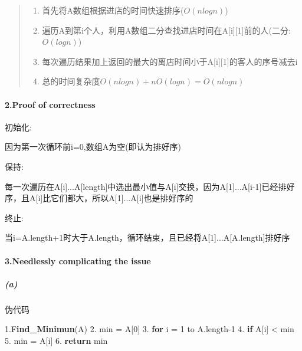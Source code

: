 \documentclass[
]{article}
\newenvironment{Shaded}{}{}
\newcommand{\BuiltInTok}[1]{#1}
\newcommand{\ControlFlowTok}[1]{\textcolor[rgb]{0.00,0.44,0.13}{\textbf{#1}}}
\newcommand{\DecValTok}[1]{\textcolor[rgb]{0.25,0.63,0.44}{#1}}
\newcommand{\ErrorTok}[1]{\textcolor[rgb]{1.00,0.00,0.00}{\textbf{#1}}}
\newcommand{\FloatTok}[1]{\textcolor[rgb]{0.25,0.63,0.44}{#1}}
\newcommand{\NormalTok}[1]{#1}
\begin{document}
\begin{quote}
\begin{enumerate}
\def\labelenumi{\arabic{enumi}.}
\item
  首先将A数组根据进店的时间快速排序(\(O(nlogn)\))
\item
  遍历A到第i个人，利用A数组二分查找进店时间在A{[}i{]}{[}1{]}前的人(二分:\(O(logn)\))
\item
  每次遍历结果加上返回的最大的离店时间小于A{[}i{]}{[}1{]}的客人的序号减去i
\item
  总的时间复杂度\(O(nlogn)+nO(logn)=O(nlogn)\)
\end{enumerate}
\end{quote}

\hypertarget{header-n26}{%
\paragraph{2.Proof of correctness}\label{header-n26}}

初始化:

因为第一次循环前i=0,数组A为空(即认为排好序)

保持:

每一次遍历在A{[}i{]}...A{[}length{]}中选出最小值与A{[}i{]}交换，因为A{[}1{]}...A{[}i-1{]}已经排好序，且A{[}i{]}比它们都大，所以A{[}1{]}...A{[}i{]}也是排好序的

终止:

当i=A.length+1时大于A.length，循环结束，且已经将A{[}1{]}...A{[}A.length{]}排好序

\hypertarget{header-n34}{%
\paragraph{3.Needlessly complicating the issue}\label{header-n34}}

\hypertarget{header-n35}{%
\subparagraph{(a)}\label{header-n35}}

伪代码

\begin{Shaded}
\begin{Highlighting}[]
\FloatTok{1.}\BuiltInTok{F}\ErrorTok{ind\_Minimun}\NormalTok{(A)}
\FloatTok{2.}\NormalTok{  min = A[}\DecValTok{0}\NormalTok{]}
\FloatTok{3.}  \ControlFlowTok{for}\NormalTok{ i = }\DecValTok{1}\NormalTok{ to A.length{-}}\DecValTok{1}
\FloatTok{4.}    \ControlFlowTok{if}\NormalTok{ A[i] \textless{} min}
\FloatTok{5.}\NormalTok{      min = A[i]}
\FloatTok{6.}  \ControlFlowTok{return}\NormalTok{ min}
\end{Highlighting}
\end{Shaded}
\end{document}
